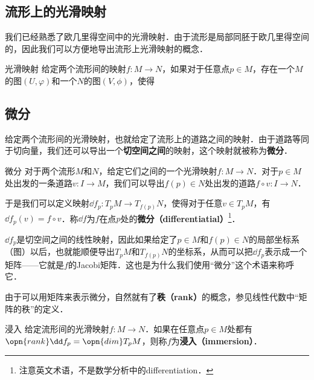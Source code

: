 

\subsection{流形上的光滑映射}

我们已经熟悉了欧几里得空间中的光滑映射．由于流形是局部同胚于欧几里得空间的，因此我们可以方便地导出流形上光滑映射的概念．

\begin{definition}{光滑映射}
给定两个流形间的映射$f:M\to N$，如果对于任意点$p\in M$，存在一个$M$的图$(U, \varphi)$和一个$N$的图$(V, \phi)$，使得
\end{definition}


\subsection{微分}

给定两个流形间的光滑映射，也就给定了流形上的道路之间的映射．由于道路等同于切向量，我们还可以导出一个\textbf{切空间之间}的映射，这个映射就被称为\textbf{微分}．

\begin{definition}{微分}
对于两个流形$M$和$N$，给定它们之间的一个光滑映射$f:M\to N$．对于$p\in M$处出发的一条道路$v:I\to M$，我们可以导出$f(p)\in N$处出发的道路$f\circ v:I\to N$．

于是我们可以定义映射$\dd f_p: T_pM\to T_{f(p)}N$，使得对于任意$v\in T_pM$，有$\dd f_p(v)=f\circ v$．称$\dd f$为$f$在点$p$处的\textbf{微分（differentiatial）}\footnote{注意英文术语，不是数学分析中的differentiation．}．
\end{definition}

$\dd f_p$是切空间之间的线性映射，因此如果给定了$p\in M$和$f(p)\in N$的局部坐标系（图）以后，也就能顺便导出$T_pM$和$T_{f(p)}N$的坐标系，从而可以把$\dd f_p$表示成一个矩阵——它就是$f$的Jacobi矩阵．这也是为什么我们使用“微分”这个术语来称呼它．

由于可以用矩阵来表示微分，自然就有了\textbf{秩（rank）}的概念，参见线性代数中“矩阵的秩”的定义．

\begin{definition}{浸入}
给定流形间的光滑映射$f:M\to N$．如果在任意点$p\in M$处都有$\opn{rank}\dd f_p=\opn{dim}T_pM$，则称$f$为\textbf{浸入（immersion）}．
\end{definition}

